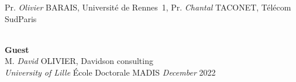 \begin{center}
    \vspace{.5cm}
    \normalsize
    Pr. \emph{Olivier} \textsc{BARAIS}, Université de Rennes~1,\newline
    Pr. \emph{Chantal} \textsc{TACONET}, Télécom SudParis

    \endminipage
    \vspace{0.6cm}
    \\
    \large
    \textbf{Guest}\\
    \normalsize
    \vspace{.5cm}
    M. \emph{David} OLIVIER, Davidson consulting
    \endminipage
    \vspace{0.8cm}
    \\
    \large
    \emph{University of Lille}
    \'Ecole Doctorale MADIS
    \endminipage
    \emph{December} 2022
    \endminipage



\end{center}